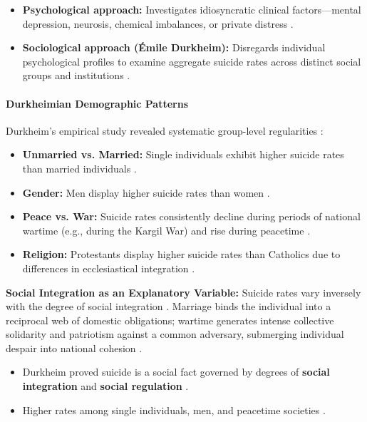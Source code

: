 \begin{ComparisonBox}
\begin{itemize}
    \item \textbf{Psychological approach:} Investigates idiosyncratic clinical factors---mental depression, neurosis, chemical imbalances, or private distress .
    \item \textbf{Sociological approach (\'Emile Durkheim):} Disregards individual psychological profiles to examine aggregate suicide rates across distinct social groups and institutions .
\end{itemize}
\end{ComparisonBox}

\paragraph{Durkheimian Demographic Patterns}
Durkheim's empirical study revealed systematic group-level regularities :
\begin{itemize}
    \item \textbf{Unmarried vs. Married:} Single individuals exhibit higher suicide rates than married individuals .
    \item \textbf{Gender:} Men display higher suicide rates than women .
    \item \textbf{Peace vs. War:} Suicide rates consistently decline during periods of national wartime (e.g., during the Kargil War) and rise during peacetime .
    \item \textbf{Religion:} Protestants display higher suicide rates than Catholics due to differences in ecclesiastical integration .
\end{itemize}

\begin{KeyConcept}
\textbf{Social Integration as an Explanatory Variable:}
Suicide rates vary inversely with the degree of social integration . Marriage binds the individual into a reciprocal web of domestic obligations; wartime generates intense collective solidarity and patriotism against a common adversary, submerging individual despair into national cohesion .
\end{KeyConcept}

\begin{QuickRevision}
\begin{itemize}
    \item Durkheim proved suicide is a social fact governed by degrees of \textbf{social integration} and \textbf{social regulation} .
    \item Higher rates among single individuals, men, and peacetime societies .
\end{itemize}
\end{QuickRevision}

